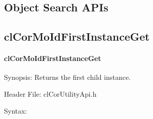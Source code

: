 \begin{flushleft}
\section{Object Search APIs}

\subsection{clCorMoIdFirstInstanceGet}
\hypertarget{pagecor123}{}\paragraph{cl\-Cor\-MoId\-First\-Instance\-Get}\label{pagecor123}
\begin{Desc}
\item[Synopsis:]Returns the first child instance.\end{Desc}
\begin{Desc}
\item[Header File:]clCorUtilityApi.h\end{Desc}
\begin{Desc}
\item[Syntax:]


\end{Desc}
\end{flushleft}
